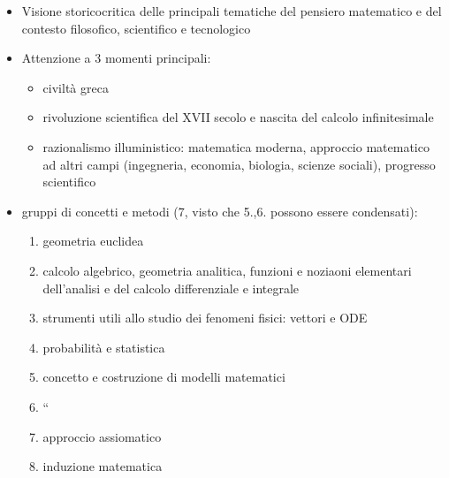 \documentclass[letterpaper,10pt,english]{jupyterBook}
\begin{document}
\label{\detokenize{ch/school-programs/current-guidelines-italy:linee-generali-e-competenze}}\begin{itemize}
\item {} 
\sphinxAtStartPar
Visione storico\sphinxhyphen{}critica delle principali tematiche del pensiero matematico e del contesto filosofico, scientifico e tecnologico

\item {} 
\sphinxAtStartPar
Attenzione a 3 momenti principali:
\begin{itemize}
\item {} 
\sphinxAtStartPar
civiltà greca

\item {} 
\sphinxAtStartPar
rivoluzione scientifica del XVII secolo e nascita del calcolo infinitesimale

\item {} 
\sphinxAtStartPar
razionalismo illuministico: matematica moderna, approccio matematico ad altri campi (ingegneria, economia, biologia, scienze sociali), progresso scientifico

\end{itemize}

\item {} 
 gruppi di concetti e metodi (7, visto che 5.,6. possono essere condensati):
\begin{enumerate}
%
\item {} 
\sphinxAtStartPar
geometria euclidea

\item {} 
\sphinxAtStartPar
calcolo algebrico, geometria analitica, funzioni e noziaoni elementari dell’analisi e del calcolo differenziale e integrale

\item {} 
\sphinxAtStartPar
strumenti utili allo studio dei fenomeni fisici: vettori e ODE

\item {} 
\sphinxAtStartPar
probabilità e statistica

\item {} 
\sphinxAtStartPar
concetto e costruzione di modelli matematici

\item {} 
\sphinxAtStartPar
“

\item {} 
\sphinxAtStartPar
approccio assiomatico

\item {} 
\sphinxAtStartPar
induzione matematica

\end{enumerate}

\end{itemize}
\end{document}
